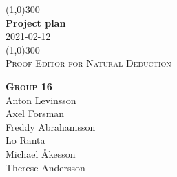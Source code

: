 \documentclass[12pt]{article}
\begin{document}

\begin{titlepage}
    \begin{center}
        \line(1,0){300}\\
        [0.25in]
        \huge{\bfseries Project plan}\\
        \LARGE{2021-02-12}\\[2mm]
        \line(1,0){300}\\[4cm]
        \textsc{Proof Editor for Natural Deduction}\\[5cm]
    \end{center}
    \begin{flushright}
        \textsc{\large \textbf{Group 16}}\\
        Anton Levinsson\\
        Axel Forsman\\
        Freddy Abrahamsson\\
        Lo Ranta\\
        Michael Åkesson\\
        Therese Andersson\\
    \end{flushright}
\end{titlepage}

\printglossaries
\newpage
\tableofcontents
\newpage
{}









\printbibliography
\end{document}
